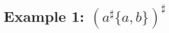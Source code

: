 \documentclass{article}
\begin{document}
\section{Example 1: $(a^\sharp\{a,b\})^\sharp$} 
%
 
\end{document}
